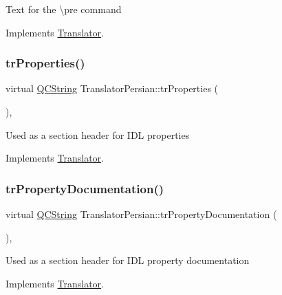 Text for the \textbackslash{}pre command 

Implements \mbox{\hyperlink{class_translator}{Translator}}.

\mbox{\label{class_translator_persian_a6ab6c59ae103a184db3fbf9d77a0a212}} 
\subsubsection{\texorpdfstring{trProperties()}{trProperties()}}
{\footnotesize\ttfamily virtual \mbox{\hyperlink{class_q_c_string}{Q\+C\+String}} Translator\+Persian\+::tr\+Properties (\begin{DoxyParamCaption}{ }\end{DoxyParamCaption})\hspace{0.3cm}{\ttfamily [inline]}, {\ttfamily [virtual]}}

Used as a section header for I\+DL properties 

Implements \mbox{\hyperlink{class_translator}{Translator}}.

\mbox{\label{class_translator_persian_a0d277d3a4462f2c9205f8864fbddbc95}} 
\subsubsection{\texorpdfstring{trPropertyDocumentation()}{trPropertyDocumentation()}}
{\footnotesize\ttfamily virtual \mbox{\hyperlink{class_q_c_string}{Q\+C\+String}} Translator\+Persian\+::tr\+Property\+Documentation (\begin{DoxyParamCaption}{ }\end{DoxyParamCaption})\hspace{0.3cm}{\ttfamily [inline]}, {\ttfamily [virtual]}}

Used as a section header for I\+DL property documentation 

Implements \mbox{\hyperlink{class_translator}{Translator}}.

\mbox{\label{class_translator_persian_acd5b1141c16b0b7ae9eab15ac5ab6b41}} 
